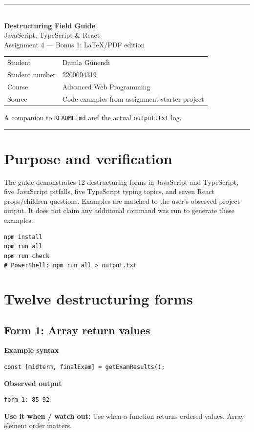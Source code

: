 \documentclass[11pt,a4paper]{article}
\begin{document}
\begin{titlepage}
\vspace*{37mm}
{\color{accent}\rule{\linewidth}{2pt}}\\[14mm]
{\Huge\bfseries\color{ink} Destructuring Field Guide}\\[5mm]
{\Large JavaScript, TypeScript \& React}\\[12mm]
{\large Assignment 4 --- Bonus 1: LaTeX/PDF edition}\\[20mm]
\begin{tabular}{@{}ll@{}}
Student & Damla G\"unendi \\
Student number & 2200004319 \\
Course & Advanced Web Programming \\
Source & Code examples from assignment starter project
\end{tabular}
\vfill
{\small A companion to \texttt{README.md} and the actual \texttt{output.txt} log.}\par
{\color{accent}\rule{\linewidth}{2pt}}
\end{titlepage}
\tableofcontents\newpage
\section{Purpose and verification}
The guide demonstrates 12 destructuring forms in JavaScript and TypeScript, five JavaScript pitfalls, five TypeScript typing topics, and seven React props/children questions. Examples are matched to the user's observed project output. It does not claim any additional command was run to generate these examples.
\begin{lstlisting}
npm install
npm run all
npm run check
# PowerShell: npm run all > output.txt
\end{lstlisting}
\section{Twelve destructuring forms}
\subsection{Form 1: Array return values}
\textbf{Example syntax}
\begin{lstlisting}
const [midterm, finalExam] = getExamResults();
\end{lstlisting}
\textbf{Observed output}
\begin{lstlisting}
form 1: 85 92
\end{lstlisting}
\textbf{Use it when / watch out:} Use when a function returns ordered values. Array element order matters.
\end{document}
